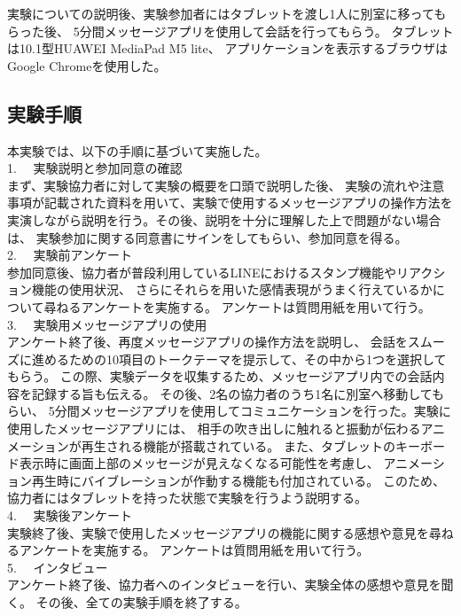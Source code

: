 \documentclass[11pt,a4paper]{ltjsreport}
\begin{document}
実験についての説明後、実験参加者にはタブレットを渡し1人に別室に移ってもらった後、
5分間メッセージアプリを使用して会話を行ってもらう。
タブレットは10.1型HUAWEI MediaPad M5 lite、
アプリケーションを表示するブラウザはGoogle Chromeを使用した。

\subsection{実験手順}
本実験では、以下の手順に基づいて実施した。\\
1.　 実験説明と参加同意の確認\\
まず、実験協力者に対して実験の概要を口頭で説明した後、
実験の流れや注意事項が記載された資料を用いて、実験で使用するメッセージアプリの操作方法を
実演しながら説明を行う。その後、説明を十分に理解した上で問題がない場合は、
実験参加に関する同意書にサインをしてもらい、参加同意を得る。\\
2. 　実験前アンケート\\
参加同意後、協力者が普段利用しているLINEにおけるスタンプ機能やリアクション機能の使用状況、
さらにそれらを用いた感情表現がうまく行えているかについて尋ねるアンケートを実施する。
アンケートは質問用紙を用いて行う。\\
3. 　実験用メッセージアプリの使用\\
アンケート終了後、再度メッセージアプリの操作方法を説明し、
会話をスムーズに進めるための10項目のトークテーマを提示して、その中から1つを選択してもらう。
この際、実験データを収集するため、メッセージアプリ内での会話内容を記録する旨も伝える。
その後、2名の協力者のうち1名に別室へ移動してもらい、
5分間メッセージアプリを使用してコミュニケーションを行った。実験に使用したメッセージアプリには、
相手の吹き出しに触れると振動が伝わるアニメーションが再生される機能が搭載されている。
また、タブレットのキーボード表示時に画面上部のメッセージが見えなくなる可能性を考慮し、
アニメーション再生時にバイブレーションが作動する機能も付加されている。
このため、協力者にはタブレットを持った状態で実験を行うよう説明する。\\
4. 　実験後アンケート\\
実験終了後、実験で使用したメッセージアプリの機能に関する感想や意見を尋ねるアンケートを実施する。
アンケートは質問用紙を用いて行う。\\
5. 　インタビュー\\
アンケート終了後、協力者へのインタビューを行い、実験全体の感想や意見を聞く。
その後、全ての実験手順を終了する。\\
\end{document}
